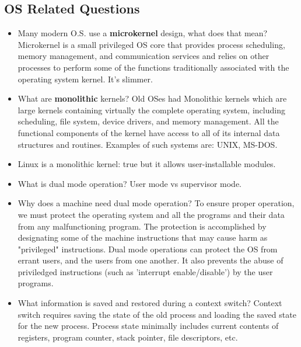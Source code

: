 \documentclass[fontsize=5pt]{scrartcl}
\begin{document}
\begin{multicols}{3}
    \subsection{OS Related Questions}
      \begin{itemize}
          \item Many modern O.S. use a \textbf{microkernel} design, what does that mean? Microkernel is a small privileged OS core that provides process
                scheduling, memory management, and communication services and relies on other processes to perform some of the functions 
                traditionally associated with the operating system kernel. It's slimmer.
          \item What are \textbf{monolithic} kernels? Old OSes had Monolithic kernels which are large kernels containing
                virtually the complete operating system, including scheduling, file 
                system, device drivers, and memory management.  All the functional
                components of the kernel have access to all of its internal data
                structures and routines. Examples of such systems are: UNIX, MS-DOS.
          \item Linux is a monolithic kernel: true but it allows user-installable modules.
          \item What is dual mode operation? User mode vs supervisor mode.
          \item Why does a machine need dual mode operation? To ensure proper operation, we must protect the operating system and all 
                the programs and their data from any malfunctioning program. 
                The protection is accomplished by designating some of the machine
                instructions that may cause harm as "privileged" instructions.
                Dual mode operations can protect the OS from errant users, and the users from one another. 
                It also prevents the abuse of priviledged instructions (such as 'interrupt enable/disable')
                by the user programs.
          \item What information is saved and restored during a context switch? Context switch requires saving the state of the old process and
                loading the saved state for the new process. Process state
                minimally includes current contents of registers, program counter,
                stack pointer, file descriptors, etc. 


\end{itemize}
\end{multicols}
\end{document}
